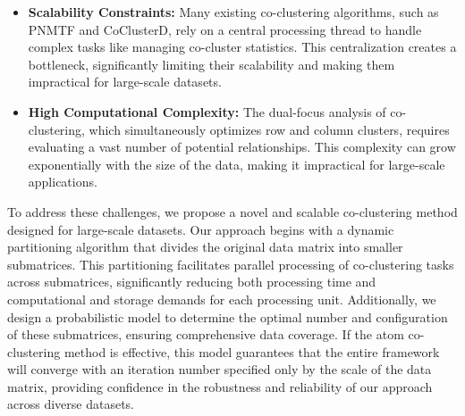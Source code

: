 \documentclass[journal]{IEEEtran}
\renewcommand{\cite}[1]{~\autocite{#1}}
\begin{document}
\begin{itemize}
  \item \textbf{Scalability Constraints:} Many existing co-clustering algorithms, such as PNMTF and CoClusterD, rely on a central processing thread to handle complex tasks like managing co-cluster statistics. This centralization creates a bottleneck, significantly limiting their scalability and making them impractical for large-scale datasets.
  \item \textbf{High Computational Complexity:} The dual-focus analysis of co-clustering, which simultaneously optimizes row and column clusters, requires evaluating a vast number of potential relationships. This complexity can grow exponentially with the size of the data, making it impractical for large-scale applications.
\end{itemize}


To address these challenges, we propose a novel and scalable co-clustering method designed for large-scale datasets. Our approach begins with a dynamic partitioning algorithm that divides the original data matrix into smaller submatrices. This partitioning facilitates parallel processing of co-clustering tasks across submatrices, significantly reducing both processing time and computational and storage demands for each processing unit. Additionally, we design a probabilistic model to determine the optimal number and configuration of these submatrices, ensuring comprehensive data coverage. If the atom co-clustering method is effective, this model guarantees that the entire framework will converge with an iteration number specified only by the scale of the data matrix, providing confidence in the robustness and reliability of our approach across diverse datasets.
\end{document}
